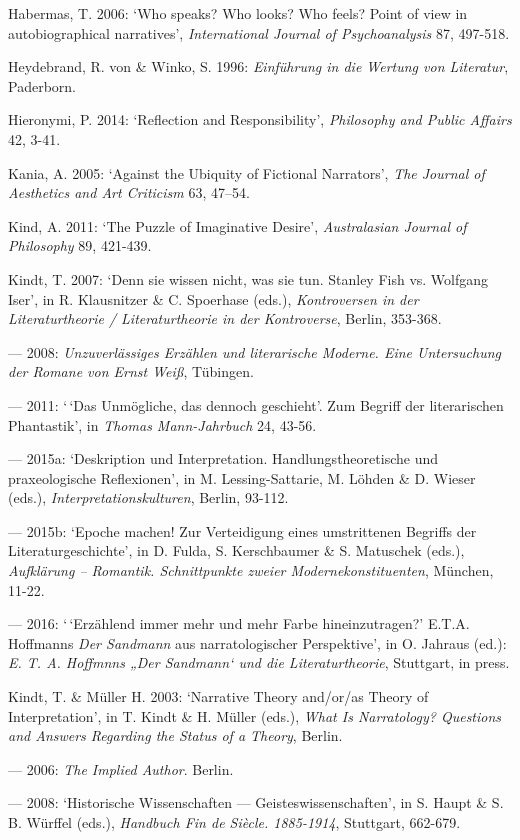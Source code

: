 \begin{hangparas}{.5cm}{1}
Habermas, T. 2006: `Who speaks? Who looks? Who feels? Point of view in autobiographical narratives', \emph{International Journal of Psychoanalysis} 87, 497-518. 

Heydebrand, R. von \& Winko, S. 1996: \emph{Einf\"uhrung in die Wertung von Literatur}, Paderborn.

Hieronymi, P. 2014: `Reflection and Responsibility', \emph{Philosophy and Public Affairs} 42, 3-41.

Kania, A. 2005: `Against the Ubiquity of Fictional Narrators', \emph{The Journal of Aesthetics and Art Criticism} 63, 47--54.

Kind, A. 2011: `The Puzzle of Imaginative Desire', \emph{Australasian Journal of Philosophy} 89, 421-439.

Kindt, T. 2007: `Denn sie wissen nicht, was sie tun. Stanley Fish vs. Wolfgang Iser', in R. Klausnitzer \& C. Spoerhase (eds.), \emph{Kontroversen in der Literaturtheorie / Literaturtheorie in der Kontroverse}, Berlin, 353-368.

--- 2008: \emph{Unzuverl\"assiges Erz\"ahlen und literarische Moderne. Eine Untersuchung der Romane von Ernst Wei{\ss}}, T\"ubingen. 

--- 2011: `\,`Das Unm\"ogliche, das dennoch geschieht'. Zum Begriff der literarischen Phantastik', in \emph{Thomas Mann-Jahrbuch} 24, 43-56.

--- 2015a: `Deskription und Interpretation. Handlungstheoretische und praxeologische Reflexionen', in M. Lessing-Sattarie, M. L\"ohden \& D. Wieser (eds.), \emph{Interpretationskulturen}, Berlin, 93-112.

--- 2015b: `Epoche machen! Zur Verteidigung eines umstrittenen Begriffs der Literaturgeschichte', in D. Fulda, S. Kerschbaumer \& S. Matuschek (eds.), \emph{Aufkl\"arung -- Romantik. Schnittpunkte zweier Modernekonstituenten}, M\"unchen, 11-22.

--- 2016: `\,`Erz\"ahlend immer mehr und mehr Farbe hineinzutragen?' E.T.A. Hoffmanns \emph{Der Sandmann} aus narratologischer Perspektive', in O. Jahraus (ed.): \emph{E. T. A. Hoffmnns „Der Sandmann` und die Literaturtheorie}, Stuttgart, in press.

Kindt, T. \& M\"uller H. 2003: `Narrative Theory and/or/as Theory of Interpretation', in T. Kindt \& H. M\"uller (eds.), \emph{What Is Narratology? Questions and Answers Regarding the Status of a Theory}, Berlin.

--- 2006: \emph{The Implied Author}. Berlin.

--- 2008: `Historische Wissenschaften --- Geisteswissenschaften', in S. Haupt \& S. B. W\"urffel (eds.), \emph{Handbuch Fin de Si\`ecle. 1885-1914}, Stuttgart, 662-679.


\end{hangparas}
